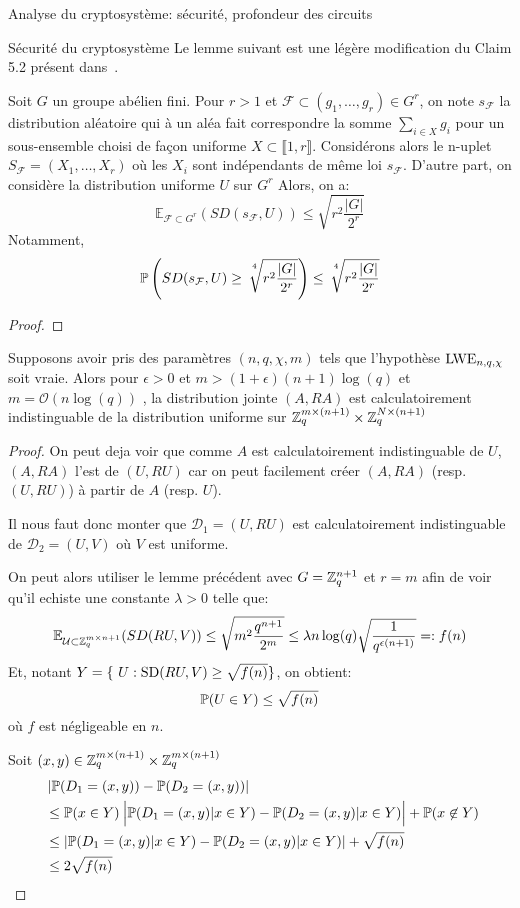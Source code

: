 \begin{section}{Analyse du cryptosystème: sécurité, profondeur des circuits}
\begin{subsection}{Sécurité du cryptosystème}
	Le lemme suivant est une légère modification du Claim 5.2 présent dans~\cite{STOC:Regev05}.
	\begin{lemme}
	Soit $G$ un groupe abélien fini. Pour $r > 1$ et 
	$\mathcal{F} \subset (g_1, \ldots, g_r) \in G^r$, on
	note
	 $s_\mathcal{F}$ la distribution aléatoire qui à un aléa
	 fait correspondre la somme $\sum_{i\in X} g_i$ pour un
	 sous-ensemble choisi de façon uniforme  $X\subset \llbracket
	 1, r \rrbracket$. 
	 Considérons alors le n-uplet $S_\mathcal{F} = (X_1, \ldots, X_r)$ où 
	 les $X_i$ sont indépendants de même loi
	 $s_\mathcal{F}$.
	 D'autre part, on considère la distribution uniforme
	 $U$ sur $G^r$
	 Alors, on a: 
	 \[\mathbb{E}_{\mathcal{F}\subset G^r}(SD(s_\mathcal{F},U)) \leq 
	   \sqrt{r^2\frac{|G|}{2^r}}\]
	 Notamment, 
	 \[\mathbb{P}\left(SD(s_\mathcal{F},U) \geq
		 \sqrt[\leftroot{-3}\uproot{8}4\:]{r^2\frac{|G|}{2^r}} \right) \leq
		 \sqrt[\leftroot{-3}\uproot{8}4\:]{r^2\frac{|G|}{2^r}}
	 \]
	\end{lemme}
	\begin{proof}
	\end{proof}
	\begin{prop}
	Supposons avoir pris des paramètres $(n, q, \chi, m)$
	tels que l'hypothèse $\text{LWE}_{n,q,\chi}$ soit vraie. Alors pour $\epsilon>0$
	et $m > (1+\epsilon)(n+1)\log(q)$ et $m = \mathcal{O}(n\log(q))$ , la distribution jointe 
	$(A, RA)$ est calculatoirement indistinguable de la
	distribution uniforme sur $\mathbb{Z}_q^{m \times (n+1)} \times \mathbb{Z}_q^{N
	\times (n+1)}$
	\end{prop}
	\begin{proof}
	On peut deja voir que comme $A$ est calculatoirement
	indistinguable de $U$, $(A, RA)$ l'est de $(U,RU)$ car on 
	peut facilement créer $(A, RA)$ (resp. $(U, RU)$) à partir de
	$A$ (resp. $U$).

	Il nous faut donc monter que $\mathcal{D}_1 = (U, RU)$ est calculatoirement
	indistinguable de $\mathcal{D}_2 = (U, V)$ où $V$ est uniforme.
	
	On peut alors utiliser le lemme précédent avec $G = \mathbb{Z}_q^{n+1}$
	et $r = m$ afin de voir qu'il echiste une constante $\lambda > 0$
	telle que:
	\[\mathbb{E}_{\mathcal{U}\subset \mathbb{Z}_q^{m\times n+1}}(SD(RU,V)) \leq 
		\sqrt{m^2\frac{q^{n+1}}{2^m}}\leq \lambda
	n\log(q)\sqrt{\frac{1}{q^{\epsilon(n+1)}}}=: f(n) \]
	Et, notant $Y = \{ U: \SD(RU,V) \geq \sqrt{f(n)}\}$, on obtient:
	\[\mathbb{P}(U \in Y) \leq \sqrt{f(n)} \]
	où $f$ est négligeable en $n$. 



	
	Soit $(x,y)\in \mathbb{Z}_q^{m \times (n+1)} \times \mathbb{Z}_q^{m \times (n+1)}$
	\begin{align*}
	&\left|\PP(D_1 = (x,y)) - \PP(D_2 = (x,y))\right| \\ &\leq \PP(x\in Y)\:
	\Big|\PP(D_1 
	= (x,y)| x\in Y) - \PP(D_2 = (x,y)|x\in Y)\Big| + \PP(x \not\in Y)  \\
	&\leq |\PP(D_1 = (x,y) | x \in Y) - \PP(D_2 = (x,y)|x \in Y)| + \sqrt{f(n)} \\
	&\leq 2\sqrt{f(n)} 
	\end{align*}
	

\end{proof}
\end{subsection}
\end{section}
